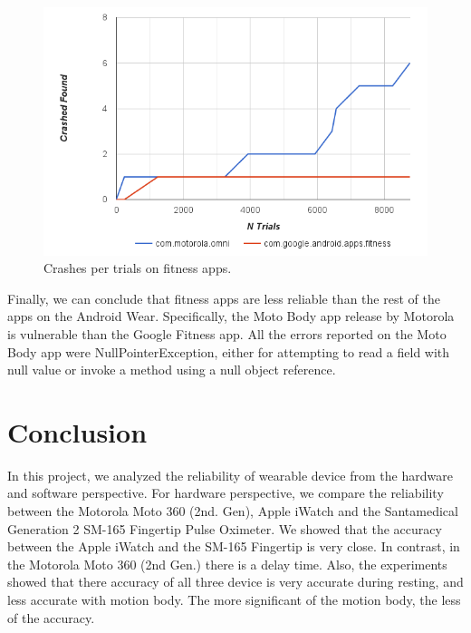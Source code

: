 \documentclass[11pt, draftclsnofoot, onecolumn]{IEEEtran}
\begin{document}
    \begin{figure}[h]	
        \centering
        \includegraphics[scale=0.50]{fuzz_crashs} 
        \caption{Crashes per trials on fitness apps.}
        \label{fig:FuzzTrials}
    \end{figure}
    
    Finally, we can conclude that fitness apps are less reliable than the rest of the apps on the Android Wear. Specifically, the Moto Body app release by Motorola is vulnerable than the Google Fitness app. All the errors reported on the Moto Body app were NullPointerException, either for attempting to read a field with null value or invoke a method using a null object reference.
    
		
	\section{Conclusion} \label{sec:Conclusion}
    In this project, we analyzed the reliability of wearable device from the hardware and software perspective. For hardware perspective, we compare the reliability between the Motorola Moto 360 (2nd. Gen), Apple iWatch and the Santamedical Generation 2 SM-165 Fingertip Pulse Oximeter. We showed that the accuracy between the Apple iWatch and the SM-165 Fingertip is very close. In contrast, in the Motorola Moto 360 (2nd Gen.) there is a delay time. Also, the experiments showed that there accuracy of all three device is very accurate during resting, and less accurate with motion body. The more significant of the motion body, the less of the accuracy.
    
\end{document}
